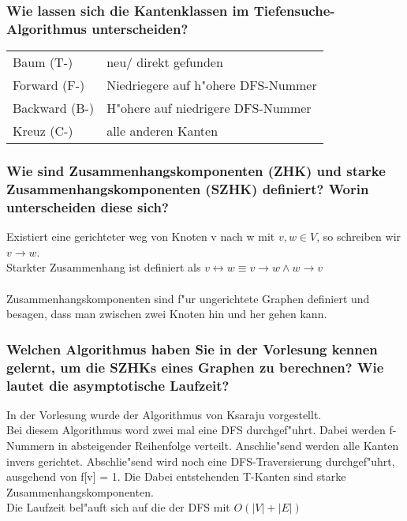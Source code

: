\documentclass{article}
\newcommand{\ra}{\rightarrow}
\newcommand{\lra}{\leftrightarrow}
\begin{document}
\subsubsection{
    Wie lassen sich die Kantenklassen im Tiefensuche-Algorithmus unterscheiden?
    }
\begin{tabular}{l|l}
    Baum (T-)       & neu/ direkt gefunden\\
    Forward (F-)    & Niedriegere auf h"ohere DFS-Nummer\\
    Backward (B-)   & H"ohere auf niedrigere DFS-Nummer\\
    Kreuz (C-)      & alle anderen Kanten\\
\end{tabular}
\subsubsection{
    Wie sind Zusammenhangskomponenten (ZHK) und starke Zusammenhangskomponenten 
        (SZHK) definiert? Worin unterscheiden diese sich?
    }
Existiert eine gerichteter weg von Knoten v nach w mit $v, w \in V$, so 
    schreiben wir $v \ra w$.\\
Starkter Zusammenhang ist definiert als 
    $v \lra w \equiv v \ra w \land w \ra v$\\
\\
Zusammenhangskomponenten sind f"ur ungerichtete Graphen definiert und besagen,
    dass man zwischen zwei Knoten hin und her gehen kann.\\
\subsubsection{
    Welchen Algorithmus haben Sie in der Vorlesung kennen gelernt, um die SZHKs 
        eines Graphen zu berechnen? Wie lautet die asymptotische Laufzeit?
    }
In der Vorlesung wurde der Algorithmus von Ksaraju vorgestellt.\\
Bei diesem Algorithmus word zwei mal eine DFS durchgef"uhrt. Dabei werden 
    f-Nummern in absteigender Reihenfolge verteilt. Anschlie"send werden alle
    Kanten invers gerichtet. Abschlie"send wird noch eine DFS-Traversierung
    durchgef"uhrt, ausgehend von f[v] = 1. Die Dabei entstehenden T-Kanten
    sind starke Zusammenhangskomponenten.\\
Die Laufzeit bel"auft sich auf die der DFS mit $O(|V| + |E|)$\\
\newpage
\end{document}
